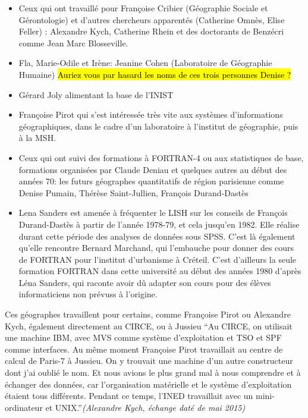 \begin{itemize}[label=\textbullet]

\item Ceux qui ont travaillé pour Françoise Cribier (Géographie Sociale et Gérontologie) et d'autres chercheurs apparentés (Catherine Omnès, Elise Feller) : Alexandre Kych, Catherine Rhein et des doctorants de Benzécri comme Jean Marc Blosseville.

\item Fla, Marie-Odile et Irène: Jeanine Cohen (Laboratoire de Géographie Humaine) \hl{Auriez vous par hasard les noms de ces trois personnes Denise ?}

\item Gérard Joly alimentant la base de l'INIST

\item Françoise Pirot qui s'est intéressée très vite aux systèmes d'informations géographiques, dans le cadre d'un laboratoire à l’institut de géographie, puis à la MSH.

\item Ceux qui ont suivi des formations à FORTRAN-4 ou aux statistiques de base, formations organisées par Claude Deniau et quelques autres au début des années 70: les futurs géographes quantitatifs de région parisienne comme Denise Pumain, Thérèse Saint-Jullien, François Durand-Dastès

\item Lena Sanders est amenée à fréquenter le LISH sur les conseils de François Durand-Dastès à partir de l'année 1978-79, et cela jusqu'en 1982. Elle réalise durant cette période des analyses de données sous SPSS. C'est là également qu'elle rencontre Bernard Marchand, qui l'embauche pour donner des cours de FORTRAN pour l'institut d'urbanisme à Créteil. C'est d'ailleurs la seule formation FORTRAN dans cette université au début des années 1980 d'après Léna Sanders, qui raconte avoir dû adapter son cours pour des élèves informaticiens non prévuss à l'origine.
\end{itemize}

Ces géographes travaillent pour certains, comme Françoise Pirot ou Alexandre Kych, également directement au CIRCE, ou à Jussieu \enquote{Au CIRCE, on utilisait une machine IBM, avec MVS comme système d'exploitation et TSO et SPF comme interfaces. Au même moment Françoise Pirot travaillait au centre de calcul de Paris-7 à Jussieu. On y trouvait une machine d'un autre constructeur dont j'ai oublié le nom. Et nous avions le plus grand mal à nous comprendre et à échanger des données, car l'organisation matérielle et le système d'exploitation étaient tous différents. Pendant ce temps, l'INED travaillait avec un mini-ordinateur et UNIX.}\textit{(Alexandre Kych, échange daté de mai 2015)}

